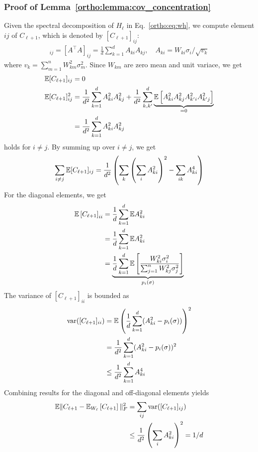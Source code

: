  \subsubsection*{Proof of Lemma~\ref{ortho:lemma:cov_concentration}}
 Given the spectral decomposition of $H_{\ell}$ in Eq.~\eqref{ortho:eq:wh}, we compute element $ij$ of $C_{\ell+1}$, which is denoted by $[C_{\ell+1}]_{ij}$:
 \begin{align*}
      [C_{\ell+1}]_{ij} = [A^\top A]_{ij} = \frac{1}{d} \sum_{k=1}^d A_{ki} A_{kj}, \quad A_{ki} = W_{ki} \sigma_i/\sqrt{v_k}
 \end{align*}
 where $v_k = \sum_{m=1}^n W_{km}^2 \sigma_m^2 $. Since $W_{km}$ are zero mean and unit variace, we get
 \begin{align*}
    \mathbb{E} [C_{\ell+1}]_{ij} & = 0 \\
    \mathbb{E} [C_{\ell+1}]_{ij}^2 & = \frac{1}{d^2}\sum_{k=1}^d A_{ki}^2 A_{kj}^2 +  \frac{1}{d^2}\sum_{k,k'}^d \underbrace{\mathbb{E} \left[ A_{ki}^2 A_{kj}^2  A_{k'i}^2 A_{k'j}^2\right]}_{=0} \\ 
    & = \frac{1}{d^2}\sum_{k=1}^d A_{ki}^2 A_{kj}^2 
 \end{align*}
 holds for $i\neq j$.
 By summing up over $i \neq j$, we get 
 \begin{align*}
     \sum_{i \neq j} \mathbb{E} [C_{\ell+1}]_{ij} = \frac{1}{d^2} \left(\sum_{k} \left( \sum_{i} A_{ki}^2 \right)^2 - \sum_{ik} A_{ki}^4\right)
 \end{align*}
 For the diagonal elements, we get 
 \begin{align*}
     \mathbb{E} \left[ C_{\ell+1} \right]_{ii} & = \frac{1}{d}\sum_{k=1}^d \mathbb{E} A_{ki}^2 \\ 
     & = \frac{1}{d}\sum_{k=1}^d \mathbb{E} A_{ki}^2 \\ 
     & = \underbrace{\frac{1}{d}\sum_{k=1}^d \mathbb{E} \left[ \frac{W_{ki}^2 \sigma_i^2 }{\sum_{j=1}^n W_{kj}^2 \sigma_j^2} \right]}_{p_i(\sigma)}
 \end{align*}
 The variance of $[C_{\ell+1}]_{ii}$ is bounded as 
 \begin{align*}
      \text{var}([C_{\ell+1}]_{ii}) & = \mathbb{E} \left(\frac{1}{d}\sum_{k=1}^d (A_{ki}^2 - p_i(\sigma))\right)^2 \\ 
      & = \frac{1}{d^2}\sum_{k=1}^d (A_{ki}^2 - p_i(\sigma))^2 \\
      & \leq \frac{1}{d^2}\sum_{k=1}^d A_{ki}^4 
 \end{align*}
 Combining results for the diagonal and off-diagonal elements yields
 \begin{align*}
     \mathbb{E} \| C_{\ell+1} - \mathbb{E}_{W_{\ell}} \left[ C_{\ell+1} \right] \|_F^2 & = \sum_{ij} \text{var}([C_{\ell+1}]_{ij}) \\
     & \leq  \frac{1}{d^2} \left( \sum_{i} A_{ki}^2 \right)^2 =1/d
 \end{align*}
